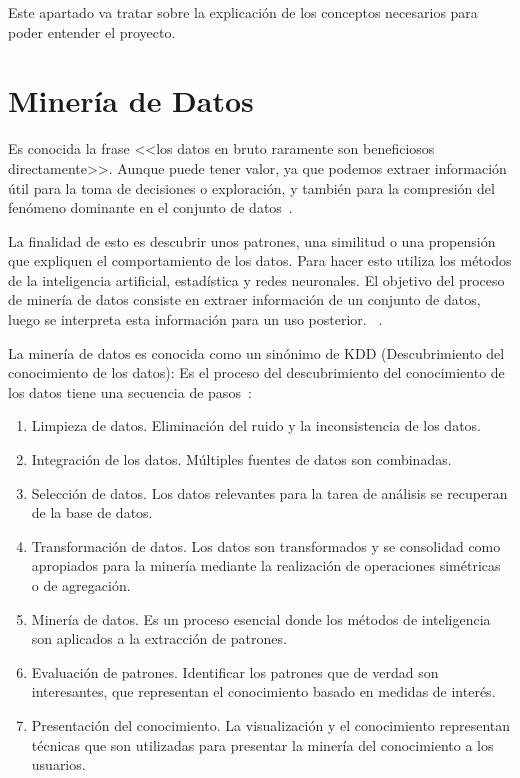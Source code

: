 
Este apartado va tratar sobre la explicación de los conceptos necesarios para poder entender el proyecto.

\section{Minería de Datos}
Es conocida la frase <<los datos en bruto raramente son beneficiosos directamente>>. Aunque puede tener valor, ya que podemos extraer información útil para la toma de decisiones o exploración, y también para la compresión del fenómeno dominante en el conjunto de datos~\cite{mineria}.

La finalidad de esto es descubrir unos patrones, una similitud o una propensión que expliquen el comportamiento de los datos. Para hacer esto utiliza los métodos de la inteligencia artificial, estadística y redes neuronales.
El objetivo del proceso de minería de datos consiste en extraer información de un conjunto de datos, luego se interpreta esta información para un uso posterior. ~\cite{wiki:datamining}.

La minería de datos es conocida como un sinónimo de KDD (Descubrimiento del conocimiento de los datos): Es el proceso del descubrimiento del conocimiento de los datos tiene una secuencia de pasos~\cite{mineria_KDD}:

\begin{enumerate}[1.]
	\item Limpieza de datos. Eliminación del ruido y la inconsistencia de los datos.
	\item Integración de los datos. Múltiples fuentes de datos son combinadas.
	\item Selección de datos. Los datos relevantes para la tarea de análisis se recuperan de la base de datos.
	\item Transformación de datos. Los datos son transformados y se consolidad como apropiados para la minería mediante la realización de operaciones simétricas o de agregación.
	\item Minería de datos. Es un proceso esencial donde los métodos de inteligencia son aplicados a la extracción de patrones.
	\item Evaluación de patrones. Identificar los patrones que de verdad son interesantes, que representan el conocimiento basado en medidas de interés.
	\item Presentación del conocimiento. La visualización y el conocimiento representan técnicas que son utilizadas para presentar la minería del conocimiento a los usuarios.
\end{enumerate}

